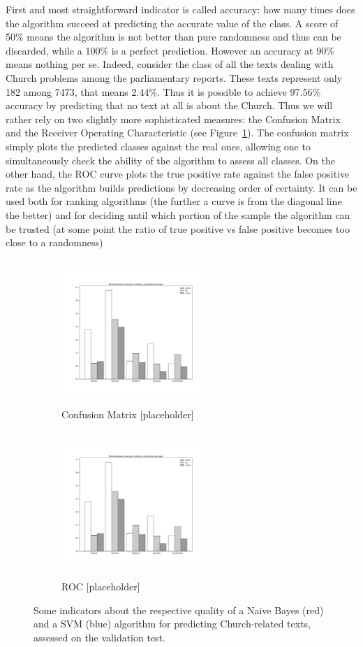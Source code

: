 \documentclass[a4paper,11pt]{article}
\begin{document}
First and most straightforward indicator is called accuracy: how many times does the algorithm succeed at predicting the accurate value of the class. A score of 50\% means the algorithm is not better than pure randomness and thus can be discarded, while a 100\% is a perfect prediction. However an accuracy at 90\% means nothing per se. Indeed, consider the class of all the texts dealing with Church problems among the parliamentary reports. These texts represent only 182 among 7473, that means 2.44\%. Thus it is possible to achieve 97.56\% accuracy by predicting that no text at all is about the Church. Thus we will rather rely on two slightly more sophisticated measures: the Confusion Matrix and the Receiver Operating Characteristic (see Figure~\ref{fig:cm_roc}). The confusion matrix simply plots the predicted classes against the real ones, allowing one to simultaneously check the ability of the algorithm to assess all classes. On the other hand, the ROC curve plots the true positive rate against the false positive rate as the algorithm builds predictions by decreasing order of certainty. It can be used both for ranking algorithms (the further a curve is from the diagonal line the better) and for deciding until which portion of the sample the algorithm can be trusted (at some point the ratio of true positive vs false positive becomes too close to a randomness)

\begin{figure}
	\begin{subfigure}{0.5\textwidth}
		\includegraphics[width=5.5cm, height=5.5cm, keepaspectratio]{./img/placeholder}
		\caption{Confusion Matrix [placeholder]}
	\end{subfigure}
	\begin{subfigure}{0.5\textwidth}
		\includegraphics[width=5.5cm, height=5.5cm, keepaspectratio]{./img/placeholder}
		\caption{ROC [placeholder]}
	\end{subfigure}
\caption{Some indicators about the respective quality of a Naive Bayes (red) and a SVM (blue) algorithm for predicting Church-related texts, assessed on the validation test.}
\label{fig:cm_roc}
\end{figure}
\end{document}

